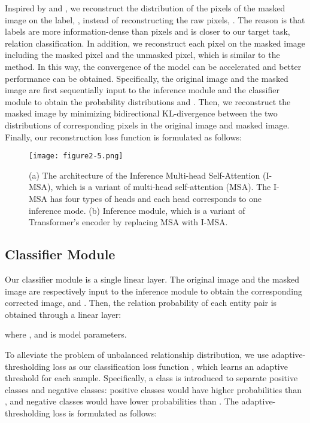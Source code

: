 \documentclass{article}
\begin{document}
Inspired by \cite{c:23} and \cite{c:24}, we reconstruct the distribution of the pixels of the masked image on the label, , instead of reconstructing the raw pixels, .
The reason is that labels are more information-dense than pixels and  is closer to our target task, relation classification.
In addition, we reconstruct each pixel on the masked image including the masked pixel and the unmasked pixel, which is similar to the \cite{c:25} method.
In this way, the convergence of the model can be accelerated and better performance can be obtained.
Specifically, the original image  and the masked image  are first sequentially input to the inference module and the classifier module to obtain the probability distributions  and . 
Then, we reconstruct the masked image by minimizing bidirectional KL-divergence between the two distributions of corresponding pixels in the original image and masked image.
Finally, our reconstruction loss function  is formulated as follows:



\begin{figure}[t]
\centering
\texttt{[image: figure2-5.png]} \caption{
(a) The architecture of the Inference Multi-head Self-Attention (I-MSA), which is a variant of multi-head self-attention (MSA). 
The I-MSA has four types of heads and each head corresponds to one inference mode.
(b) Inference module, which is a variant of Transformer's encoder by replacing MSA with I-MSA.
}
\label{fig2}
\end{figure}


\subsection{Classifier Module}
\label{sec2.3}
Our classifier module is a single linear layer.
The original image  and the masked image  are respectively input to the inference module to obtain the corresponding corrected image,  and .
Then, the relation probability of each entity pair is obtained through a linear layer:

where , and  is model parameters.

To alleviate the problem of unbalanced relationship distribution, we use adaptive-thresholding loss \cite{c:11} as our classification loss function , which learns an adaptive threshold for each sample.
Specifically, a  class is introduced to separate positive classes and negative classes: positive classes would have higher probabilities than , and negative classes would have lower probabilities than .
The adaptive-thresholding loss is formulated as follows:
\end{document}
